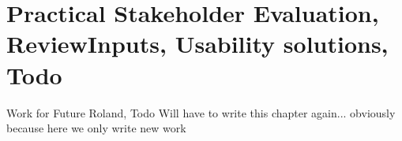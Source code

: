\section{Practical Stakeholder Evaluation, ReviewInputs, Usability solutions, Todo}


Work for Future Roland, Todo
Will have to write this chapter again... obviously because here we only write new work
